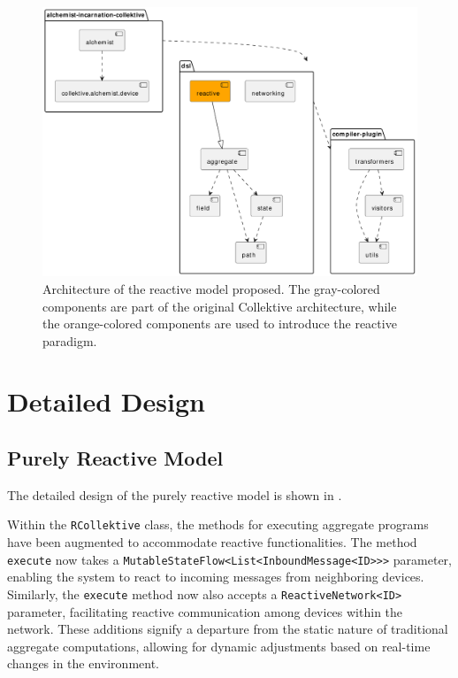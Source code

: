 \begin{figure}
    \centering
    \includegraphics[width=\linewidth]{figures/collektive-prm-architecture.pdf}
    \caption{Architecture of the reactive model proposed. The gray-colored components are part of the original Collektive architecture, while the orange-colored components are used to introduce the reactive paradigm.}
    \label{fig:collektive-prm-architecture}
\end{figure}

\section{Detailed Design}
\label{section:detailed-design}

\subsection{Purely Reactive Model}
\label{subsection:purely-reactive-model}

The detailed design of the purely reactive model is shown in .

Within the \texttt{RCollektive} class, the methods for executing aggregate programs have been augmented to accommodate reactive functionalities. The method \texttt{execute} now takes a \texttt{MutableStateFlow<List<InboundMessage<ID>>>} parameter, enabling the system to react to incoming messages from neighboring devices. Similarly, the \texttt{execute} method now also accepts a \texttt{ReactiveNetwork<ID>} parameter, facilitating reactive communication among devices within the network. These additions signify a departure from the static nature of traditional aggregate computations, allowing for dynamic adjustments based on real-time changes in the environment.

